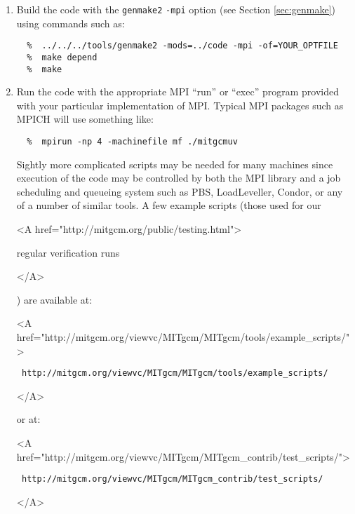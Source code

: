 \begin{enumerate}
\begin{itemize}
  \item \begin{rawhtml} <A
      href="http://www.osc.edu/~pw/mpiexec/">
    \end{rawhtml}
    MPIexec
    \begin{rawhtml} </A> \end{rawhtml}
  \end{itemize}
  
\item Build the code with the \texttt{genmake2} \texttt{-mpi} option
  (see Section \ref{sec:genmake}) using commands such as:
{\footnotesize \begin{verbatim}
  %  ../../../tools/genmake2 -mods=../code -mpi -of=YOUR_OPTFILE
  %  make depend
  %  make
\end{verbatim} }
  
\item Run the code with the appropriate MPI ``run'' or ``exec''
  program provided with your particular implementation of MPI.
  Typical MPI packages such as MPICH will use something like:
\begin{verbatim}
  %  mpirun -np 4 -machinefile mf ./mitgcmuv
\end{verbatim}
  Sightly more complicated scripts may be needed for many machines
  since execution of the code may be controlled by both the MPI
  library and a job scheduling and queueing system such as PBS,
  LoadLeveller, Condor, or any of a number of similar tools.  A few
  example scripts (those used for our \begin{rawhtml} <A
    href="http://mitgcm.org/public/testing.html"> \end{rawhtml}regular
  verification runs\begin{rawhtml} </A> \end{rawhtml}) are available
  at:
  \begin{rawhtml} <A
    href="http://mitgcm.org/viewvc/MITgcm/MITgcm/tools/example_scripts/">
  \end{rawhtml}
  {\footnotesize \tt
    http://mitgcm.org/viewvc/MITgcm/MITgcm/tools/example\_scripts/ }
  \begin{rawhtml} </A> \end{rawhtml}
  or at:
  \begin{rawhtml} <A
    href="http://mitgcm.org/viewvc/MITgcm/MITgcm_contrib/test_scripts/">
  \end{rawhtml}
  {\footnotesize \tt
    http://mitgcm.org/viewvc/MITgcm/MITgcm\_contrib/test\_scripts/ }
  \begin{rawhtml} </A> \end{rawhtml}

\end{enumerate}

